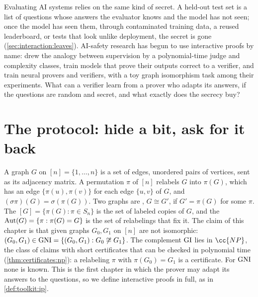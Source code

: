 \begin{refsection}
Evaluating AI systems relies on the same kind of secret. A held-out test set is a list of questions whose answers the evaluator knows and the model has not seen; once the model has seen them, through contaminated training data, a reused leaderboard, or tests that look unlike deployment, the secret is gone (\cref{sec:interaction:leaves}). AI-safety research has begun to use interactive proofs by name: \textcite{IrvingEtAl2018} drew the analogy between supervision by a polynomial-time judge and complexity classes, \textcite{AmitEtAl2025} train models that prove their outputs correct to a verifier, and \textcite{HammondAdamDay2025} train neural provers and verifiers, with a toy graph isomorphism task among their experiments. What can a verifier learn from a prover who adapts its answers, if the questions are random and secret, and what exactly does the secrecy buy?

\section{The protocol: hide a bit, ask for it back}\label{sec:interaction:protocol}

A graph $G$ on $[n]=\{1,\dots,n\}$ is a set of edges, unordered pairs of vertices, sent as its adjacency matrix. A permutation $\pi$ of $[n]$ relabels $G$ into $\pi(G)$, which has an edge $\{\pi(u),\pi(v)\}$ for each edge $\{u,v\}$ of $G$, and $(\sigma\pi)(G)=\sigma(\pi(G))$. Two graphs are , $G\cong G'$, if $G'=\pi(G)$ for some $\pi$. The  $[G]=\{\pi(G):\pi\in S_n\}$ is the set of labeled copies of $G$, and the  $\operatorname{Aut}(G)=\{\pi:\pi(G)=G\}$ is the set of relabelings that fix it. The claim of this chapter is that given graphs $G_0,G_1$ on $[n]$ are not isomorphic: $(G_0,G_1)\in\mathrm{GNI}=\{(G_0,G_1):G_0\not\cong G_1\}$. The complement $\mathrm{GI}$ lies in $\cc{NP}$, the class of claims with short certificates that can be checked in polynomial time (\cref{thm:certificates:np}): a relabeling $\pi$ with $\pi(G_0)=G_1$ is a certificate. For $\mathrm{GNI}$ none is known. This is the first chapter in which the prover may adapt its answers to the questions, so we define interactive proofs in full, as in \cref{def:toolkit:ip}.


\end{refsection}
